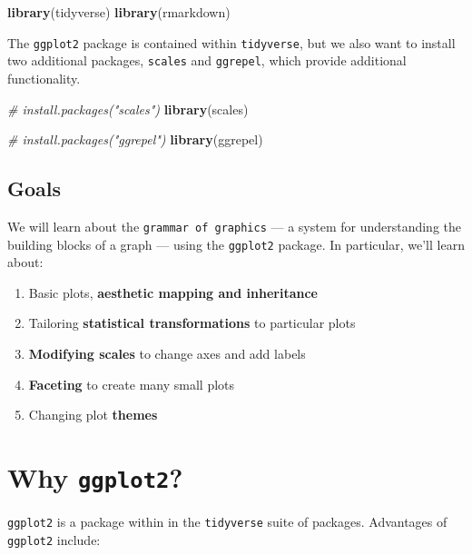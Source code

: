 \documentclass[
]{book}
\newenvironment{Shaded}{\begin{snugshade}}{\end{snugshade}}
\newcommand{\CommentTok}[1]{\textcolor[rgb]{0.56,0.35,0.01}{\textit{#1}}}
\newcommand{\KeywordTok}[1]{\textcolor[rgb]{0.13,0.29,0.53}{\textbf{#1}}}
\newcommand{\NormalTok}[1]{#1}
\providecommand{\tightlist}{%
  \setlength{\itemsep}{0pt}\setlength{\parskip}{0pt}}
\begin{document}
\begin{Shaded}
\begin{Highlighting}[]
\KeywordTok{library}\NormalTok{(tidyverse)}
\KeywordTok{library}\NormalTok{(rmarkdown)}
\end{Highlighting}
\end{Shaded}

The \texttt{ggplot2} package is contained within \texttt{tidyverse}, but we also want to
install two additional packages, \texttt{scales} and \texttt{ggrepel}, which provide
additional functionality.

\begin{Shaded}
\begin{Highlighting}[]
\CommentTok{# install.packages("scales")}
\KeywordTok{library}\NormalTok{(scales)}

\CommentTok{# install.packages("ggrepel") }
\KeywordTok{library}\NormalTok{(ggrepel)}
\end{Highlighting}
\end{Shaded}

\hypertarget{goals-1}{%
\subsection{Goals}\label{goals-1}}

We will learn about the \texttt{grammar\ of\ graphics} --- a system for understanding
the building blocks of a graph --- using the \texttt{ggplot2} package. In particular,
we'll learn about:

\begin{enumerate}
\def\labelenumi{\arabic{enumi}.}
\tightlist
\item
  Basic plots, \textbf{aesthetic mapping and inheritance}
\item
  Tailoring \textbf{statistical transformations} to particular plots
\item
  \textbf{Modifying scales} to change axes and add labels
\item
  \textbf{Faceting} to create many small plots
\item
  Changing plot \textbf{themes}
\end{enumerate}

\hypertarget{why-ggplot2}{%
\section{\texorpdfstring{Why \texttt{ggplot2}?}{Why ggplot2?}}\label{why-ggplot2}}

\texttt{ggplot2} is a package within in the \texttt{tidyverse} suite of packages. Advantages of \texttt{ggplot2} include:
\end{document}
